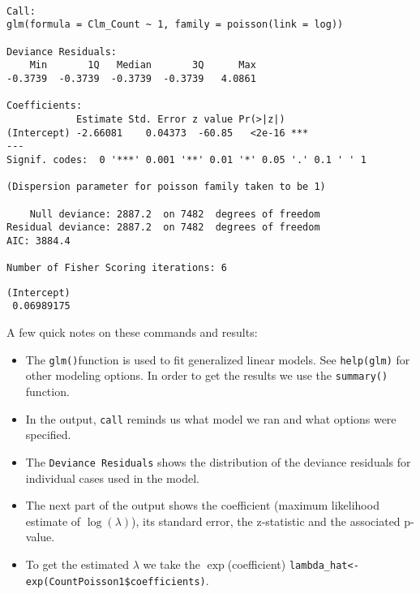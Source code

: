 \documentclass[]{book}
\newenvironment{Shaded}{\begin{snugshade}}{\end{snugshade}}
\newcommand{\KeywordTok}[1]{\textcolor[rgb]{0.13,0.29,0.53}{\textbf{#1}}}
\newcommand{\OperatorTok}[1]{\textcolor[rgb]{0.81,0.36,0.00}{\textbf{#1}}}
\newcommand{\NormalTok}[1]{#1}
\providecommand{\tightlist}{%
  \setlength{\itemsep}{0pt}\setlength{\parskip}{0pt}}
\theoremstyle{definition}
\theoremstyle{definition}
\theoremstyle{definition}
\theoremstyle{remark}
\begin{document}
\begin{verbatim}

Call:
glm(formula = Clm_Count ~ 1, family = poisson(link = log))

Deviance Residuals: 
    Min       1Q   Median       3Q      Max  
-0.3739  -0.3739  -0.3739  -0.3739   4.0861  

Coefficients:
            Estimate Std. Error z value Pr(>|z|)    
(Intercept) -2.66081    0.04373  -60.85   <2e-16 ***
---
Signif. codes:  0 '***' 0.001 '**' 0.01 '*' 0.05 '.' 0.1 ' ' 1

(Dispersion parameter for poisson family taken to be 1)

    Null deviance: 2887.2  on 7482  degrees of freedom
Residual deviance: 2887.2  on 7482  degrees of freedom
AIC: 3884.4

Number of Fisher Scoring iterations: 6
\end{verbatim}

\begin{Shaded}
\end{Shaded}

\begin{verbatim}
(Intercept) 
 0.06989175 
\end{verbatim}

A few quick notes on these commands and results:

\begin{itemize}
\tightlist
\item
  The \texttt{glm()}function is used to fit generalized linear models.
  See \texttt{help(glm)} for other modeling options. In order to get the
  results we use the \texttt{summary()} function.
\item
  In the output, \texttt{call} reminds us what model we ran and what
  options were specified.
\item
  The \texttt{Deviance\ Residuals} shows the distribution of the
  deviance residuals for individual cases used in the model.
\item
  The next part of the output shows the coefficient (maximum likelihood
  estimate of \(\log(\lambda)\)), its standard error, the z-statistic
  and the associated p-value.
\item
  To get the estimated \(\lambda\) we take the \(\exp\)(coefficient)
  \texttt{lambda\_hat\textless{}-exp(CountPoisson1\$coefficients)}.
\end{itemize}
\end{document}
